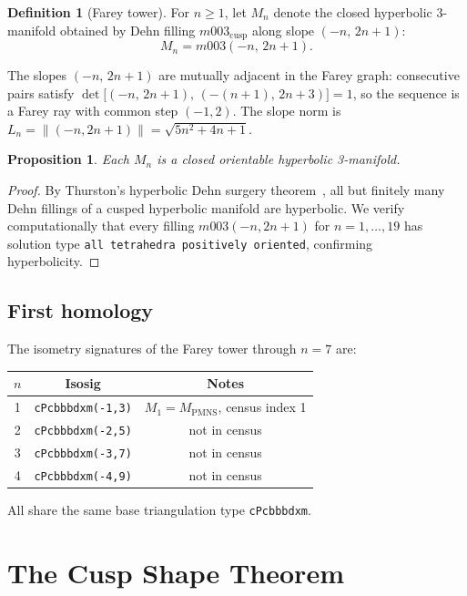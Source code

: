 \documentclass[11pt,a4paper]{article}
\newtheorem{proposition}[theorem]{Proposition}
\theoremstyle{definition}
\newtheorem{definition}[theorem]{Definition}
\newcommand{\Mn}{M_n}
\newcommand{\Mcusp}{m003_{\mathrm{cusp}}}
\newcommand{\MPMNS}{M_{\mathrm{PMNS}}}
\begin{document}
\begin{definition}[Farey tower]
For $n \geq 1$, let $\Mn$ denote the closed hyperbolic 3-manifold
obtained by Dehn filling $\Mcusp$ along slope $(-n,\,2n+1)$:
\[
  \Mn = m003(-n,\,2n+1).
\]
\end{definition}

The slopes $(-n,\,2n+1)$ are mutually adjacent in the Farey graph:
consecutive pairs satisfy
$\det\bigl[(-n,\,2n+1),\,(-(n+1),\,2n+3)\bigr] = 1$,
so the sequence is a Farey ray with common step $(-1,2)$.
The slope norm is $L_n = \|(-n,2n+1)\| = \sqrt{5n^2+4n+1}$.

\begin{proposition}
Each $\Mn$ is a closed orientable hyperbolic 3-manifold.
\end{proposition}

\begin{proof}
By Thurston's hyperbolic Dehn surgery theorem~\cite{Thurston78},
all but finitely many Dehn fillings of a cusped hyperbolic manifold
are hyperbolic.
We verify computationally that every filling $m003(-n,2n+1)$ for
$n=1,\ldots,19$ has solution type
\texttt{all tetrahedra positively oriented}, confirming hyperbolicity.
\end{proof}

\subsection{First homology}

The isometry signatures of the Farey tower through $n=7$ are:
\begin{center}
\begin{tabular}{ccc}
\toprule
$n$ & Isosig & Notes \\
\midrule
1 & \texttt{cPcbbbdxm(-1,3)} & $M_1 = \MPMNS$, census index 1 \\
2 & \texttt{cPcbbbdxm(-2,5)} & not in census \\
3 & \texttt{cPcbbbdxm(-3,7)} & not in census \\
4 & \texttt{cPcbbbdxm(-4,9)} & not in census \\
\bottomrule
\end{tabular}
\end{center}
All share the same base triangulation type \texttt{cPcbbbdxm}.

\section{The Cusp Shape Theorem}
\label{sec:cusp}
\end{document}

